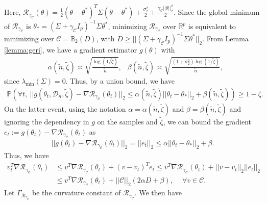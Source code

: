 \documentclass{article}
\begin{document}
Here, $\mathcal{R}_{\gamma_{\mathcal{C}}}(\theta) = \frac{1}{2}(\theta - \theta^*)^T\Sigma(\theta - \theta^*) + \frac{\sigma_2^2}{2} + \frac{\gamma_{\mathcal{C}}||\theta||_2^2}{2}$. Since the global minimum of $\mathcal{R}_{\gamma_{\mathcal{C}}}$ is $\theta_{*} = (\Sigma + \gamma_{\mathcal{C}}I_p)^{-1}\Sigma\theta^*$, minimizing $\mathcal{R}_{\gamma_{\mathcal{C}}}$ over $\mathbb{R}^p$ is equivalent to minimizing over $\mathcal{C} = \mathbb{B}_2\left(D\right)$, with $D \geq ||(\Sigma + \gamma_{\mathcal{C}}I_p)^{-1}\Sigma\theta^*||_2$. From Lemma \ref{lemma:geri}, we have a gradient estimator $g(\theta)$ with
\begin{align*}
&\alpha(\widetilde{n}, \widetilde{\zeta}) \asymp \sqrt{\frac{\log(1/\widetilde{\zeta})}{\widetilde{n}}},
&\beta(\widetilde{n}, \widetilde{\zeta}) \asymp \sqrt{\frac{(1 + \sigma_2^2)\log(1/\widetilde{\zeta})}{\widetilde{n}}},
\end{align*}
since $\lambda_{\min}(\Sigma) = 0$. Thus, by a union bound, we have 
\begin{align*}
 \mathbb{P}(\forall t, \ ||g(\theta_t, \mathcal{D}_n, \widetilde{\zeta}) - \nabla\mathcal{R}_{\gamma_{\mathcal{C}}}(\theta_t)||_2 \leq \alpha(\widetilde{n}, \widetilde{\zeta})||\theta_t - \theta_*||_2 + \beta(\widetilde{n}, \widetilde{\zeta})) \geq 1 - \zeta.
\end{align*}
On the latter event, using the notation $\alpha = \alpha(\widetilde{n}, \widetilde{\zeta})$ and $\beta = \beta(\widetilde{n}, \widetilde{\zeta})$ and ignoring the dependency in $g$ on the samples and $\widetilde{\zeta}$, we can bound the gradient $e_t := g(\theta_t)-\nabla\mathcal{R}_{\gamma_{\mathcal{C}}}(\theta_t)$ as
\begin{align*}
||g(\theta_t) - \nabla\mathcal{R}_{\gamma_{\mathcal{C}}}(\theta_t)||_2 = ||e_t||_2 \leq \alpha||\theta_t - \theta_*||_2 + \beta.
\end{align*}
Thus, we have
\begin{align*}
v_t^T\nabla\mathcal{R}_{\gamma_{\mathcal{C}}}(\theta_t) &\leq v^T\nabla\mathcal{R}_{\gamma_{\mathcal{C}}}(\theta_t) + (v - v_t)^Te_t \leq v^T\nabla\mathcal{R}_{\gamma_{\mathcal{C}}}(\theta_t) + ||v - v_t||_2||e_t||_2\\
&\leq v^T\nabla\mathcal{R}_{\gamma_{\mathcal{C}}}(\theta_t) + ||\mathcal{C}||_2(2\alpha D + \beta), \ \quad \forall v \in \mathcal{C}.
\end{align*}
Let $\Gamma_{\mathcal{R}_{\gamma_{\mathcal{C}}}}$ be the curvature constant of $\mathcal{R}_{\gamma_{\mathcal{C}}}$. We then have
\end{document}
